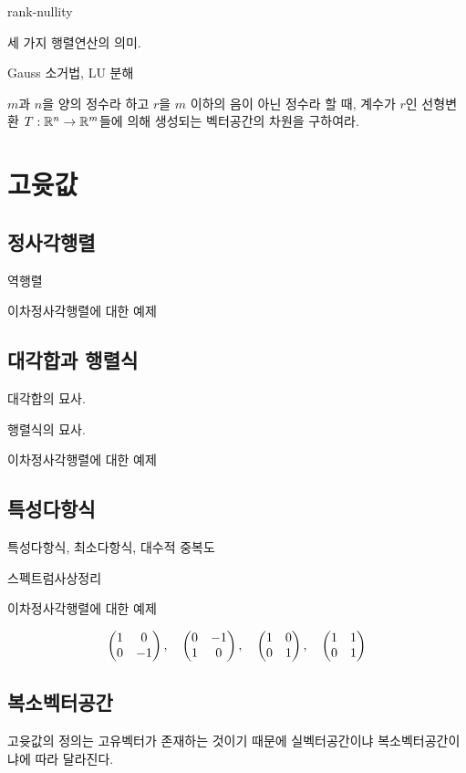\documentclass{../../large}
\begin{document}
rank-nullity

세 가지 행렬연산의 의미.

Gauss 소거법, LU 분해




\begin{example}
$m$과 $n$을 양의 정수라 하고 $r$을 $m$ 이하의 음이 아닌 정수라 할 때, 계수가 $r$인 선형변환 $T:\mathbb{R}^n\to\mathbb{R}^m$들에 의해 생성되는 벡터공간의 차원을 구하여라.
\end{example}








\chapter{고윳값}

\section{정사각행렬}

역행렬


이차정사각행렬에 대한 예제

\section{대각합과 행렬식}

대각합의 묘사.

행렬식의 묘사.


이차정사각행렬에 대한 예제


\section{특성다항식}

특성다항식, 최소다항식, 대수적 중복도


스펙트럼사상정리


이차정사각행렬에 대한 예제

\[\begin{pmatrix}1&0\\0&-1\end{pmatrix},\quad\begin{pmatrix}0&-1\\1&0\end{pmatrix},\quad\begin{pmatrix}1&0\\0&1\end{pmatrix},\quad\begin{pmatrix}1&1\\0&1\end{pmatrix}\]


\section{복소벡터공간}

고윳값의 정의는 고유벡터가 존재하는 것이기 때문에 실벡터공간이냐 복소벡터공간이냐에 따라 달라진다.
\end{document}
